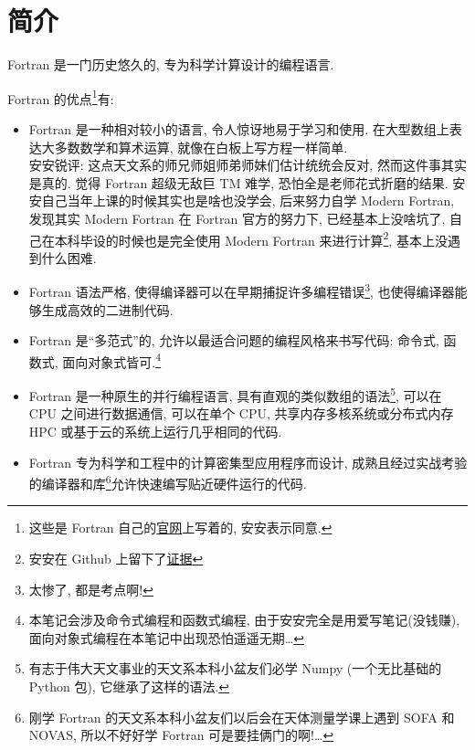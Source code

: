 \chapter{简介}

Fortran 是一门历史悠久的, 专为科学计算设计的编程语言.

Fortran 的优点\footnote{这些是 Fortran 自己的\href{https://fortran-lang.org/}{官网}上写着的, 安安表示同意.}有:
\begin{itemize}
    \item Fortran 是一种相对较小的语言, 令人惊讶地易于学习和使用. 在大型数组上表达大多数数学和算术运算, 就像在白板上写方程一样简单.\\安安锐评: 这点天文系的师兄师姐师弟师妹们估计统统会反对, 然而这件事其实是真的. 觉得 Fortran 超级无敌巨 TM 难学, 恐怕全是老师花式折磨的结果. 安安自己当年上课的时候其实也是啥也没学会, 后来努力自学 Modern Fortran, 发现其实 Modern Fortran 在 Fortran 官方的努力下, 已经基本上没啥坑了, 自己在本科毕设的时候也是完全使用 Modern Fortran 来进行计算\footnote{安安在 Github 上留下了\href{https://github.com/GasinAn/echo1}{证据}}, 基本上没遇到什么困难.
    \item Fortran 语法严格, 使得编译器可以在早期捕捉许多编程错误\footnote{太惨了, 都是考点啊!}, 也使得编译器能够生成高效的二进制代码.
    \item Fortran 是``多范式''的, 允许以最适合问题的编程风格来书写代码: 命令式, 函数式, 面向对象式皆可.\footnote{本笔记会涉及命令式编程和函数式编程, 由于安安完全是用爱写笔记(没钱赚), 面向对象式编程在本笔记中出现恐怕遥遥无期\dots{}}
    \item Fortran 是一种原生的并行编程语言, 具有直观的类似数组的语法\footnote{有志于伟大天文事业的天文系本科小盆友们必学 Numpy (一个无比基础的 Python 包), 它继承了这样的语法.}, 可以在 CPU 之间进行数据通信, 可以在单个 CPU, 共享内存多核系统或分布式内存 HPC 或基于云的系统上运行几乎相同的代码.
    \item Fortran 专为科学和工程中的计算密集型应用程序而设计, 成熟且经过实战考验的编译器和库\footnote{刚学 Fortran 的天文系本科小盆友们以后会在天体测量学课上遇到 SOFA 和 NOVAS, 所以不好好学 Fortran 可是要挂俩门的啊!\dots{}}允许快速编写贴近硬件运行的代码.
\end{itemize}

